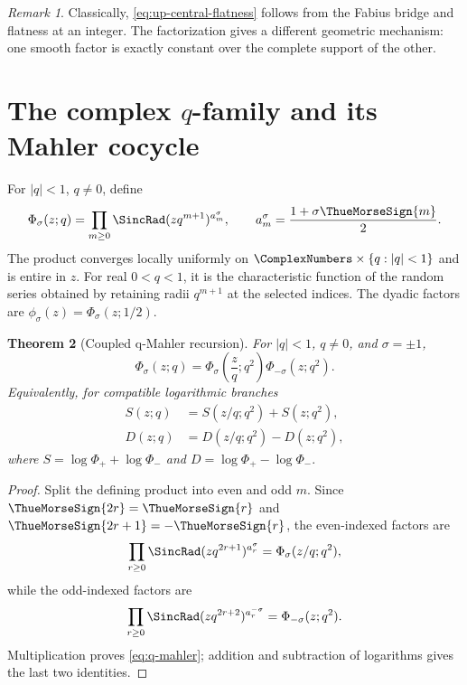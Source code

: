 \documentclass[11pt,oneside]{article}
\numberwithin{equation}{section}
\newtheorem{theorem}{Theorem}[section]
\theoremstyle{definition}
\theoremstyle{remark}
\newtheorem{remark}[theorem]{Remark}
\begin{document}
\begin{remark}
Classically, \eqref{eq:up-central-flatness} follows from the Fabius bridge and flatness at
an integer.  The factorization gives a different geometric mechanism: one smooth factor
is exactly constant over the complete support of the other.
\end{remark}

\section{The complex \texorpdfstring{$q$}{q}-family and its Mahler cocycle}
\label{sec:q-mahler}

For $|q|<1$, $q\ne0$, define
\begin{equation}
 \Phi_\sigma(z;q)=\prod_{m\ge0}
 \SincRad(zq^{m+1})^{a_m^\sigma},
 \qquad
 a_m^\sigma=\frac{1+\sigma\ThueMorseSign{m}}{2}.
 \label{eq:Phiq}
\end{equation}
The product converges locally uniformly on $\ComplexNumbers\times\{q:|q|<1\}$ and is entire in $z$.
For real $0<q<1$, it is the characteristic function of the random series obtained by
retaining radii $q^{m+1}$ at the selected indices.  The dyadic factors are
$\phi_\sigma(z)=\Phi_\sigma(z;1/2)$.

\begin{theorem}[Coupled q-Mahler recursion]
\label{thm:q-mahler}
For $|q|<1$, $q\ne0$, and $\sigma=\pm1$,
\begin{equation}
 \boxed{\quad
 \Phi_\sigma(z;q)
 =\Phi_\sigma\!\left(\frac zq;q^2\right)
  \Phi_{-\sigma}(z;q^2).
 \quad}
 \label{eq:q-mahler}
\end{equation}
Equivalently, for compatible logarithmic branches
\begin{align}
 S(z;q)&=S(z/q;q^2)+S(z;q^2),
 \label{eq:S-mahler}\\
 D(z;q)&=D(z/q;q^2)-D(z;q^2),
 \label{eq:D-mahler}
\end{align}
where
\(
 S=\log\Phi_++\log\Phi_-
\)
and
\(
 D=\log\Phi_+-\log\Phi_-.
\)
\end{theorem}

\begin{proof}
Split the defining product into even and odd $m$.  Since
$\ThueMorseSign{2r}=\ThueMorseSign{r}$ and $\ThueMorseSign{2r+1}=-\ThueMorseSign{r}$, the even-indexed factors are
\[
 \prod_{r\ge0}\SincRad(zq^{2r+1})^{a_r^\sigma}
 =\Phi_\sigma(z/q;q^2),
\]
while the odd-indexed factors are
\[
 \prod_{r\ge0}\SincRad(zq^{2r+2})^{a_r^{-\sigma}}
 =\Phi_{-\sigma}(z;q^2).
\]
Multiplication proves \eqref{eq:q-mahler}; addition and subtraction of logarithms gives
the last two identities.
\end{proof}
\end{document}
